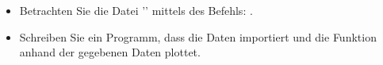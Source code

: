 \begin{aufg}[0]
\begin{itemize}
\item Betrachten Sie die Datei '' mittels des Befehls:
  .
\item Schreiben Sie ein Programm, dass die Daten importiert und die
  Funktion anhand der gegebenen Daten plottet.
\end{itemize}
\end{aufg}